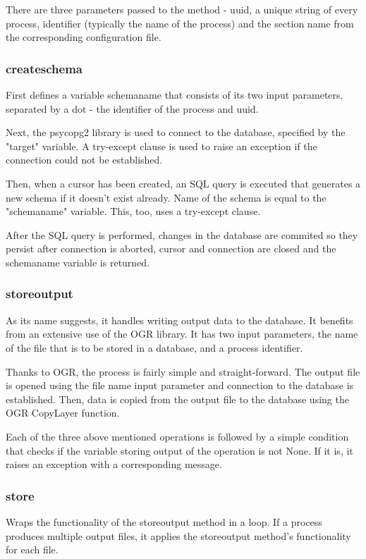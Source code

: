 There are three parameters passed to the method - uuid, a unique string of every process, identifier (typically the name of the process) and the section name from the corresponding configuration file.

\subsubsection{create\textunderscore schema} 
First defines a variable schema\textunderscore name that consists of its two input parameters, separated by a dot - the identifier of the process and uuid.

Next, the psycopg2 library is used to connect to the database, specified by the "target" variable. A try-except clause is used to raise an exception if the connection could not be established. 

Then, when a cursor has been created, an SQL query is executed that generates a new schema if it doesn't exist already. Name of the schema is equal to the "schema\textunderscore name" variable. This, too, uses a try-except clause.

After the SQL query is performed, changes in the database are commited so they persist after connection is aborted, cursor and connection are closed and the schema\textunderscore name variable is returned.

\subsubsection{store\textunderscore output} 
As its name suggests, it handles writing output data to the database. It benefits from an extensive use of the OGR library. It has two input parameters, the name of the file that is to be stored in a database, and a process identifier. 

Thanks to OGR, the process is fairly simple and straight-forward. The output file is opened using the file name input parameter and connection to the database is established. Then, data is copied from the output file to the database using the OGR CopyLayer function. 

Each of the three above mentioned operations is followed by a simple condition that checks if the variable storing output of the operation is not None. If it is, it raises an exception with a corresponding message.


\subsubsection{store} 
Wraps the functionality of the store\textunderscore output method in a loop. If a process produces multiple output files, it applies the store\textunderscore output method's functionality for each file. 

